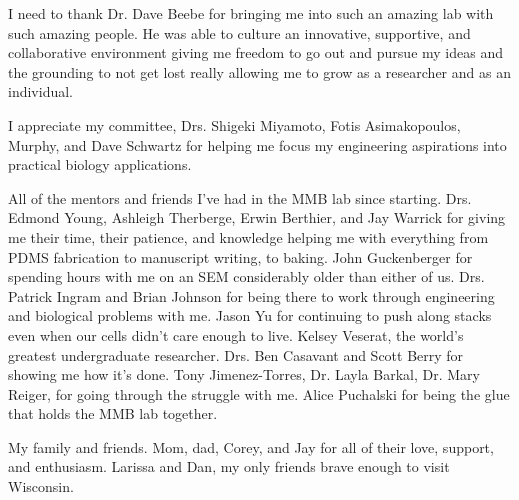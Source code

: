 I need to thank Dr. Dave Beebe for bringing me into such an amazing lab with such amazing people. He was able to culture an innovative, supportive, and collaborative environment giving me freedom to go out and pursue my ideas and the grounding to not get lost really allowing me to grow as a researcher and as an individual.

I appreciate my committee, Drs. Shigeki Miyamoto, Fotis Asimakopoulos, Murphy, and Dave Schwartz for helping me focus my engineering aspirations into practical biology applications.

All of the mentors and friends I've had in the MMB lab since starting. Drs. Edmond Young, Ashleigh Therberge, Erwin Berthier, and Jay Warrick for giving me their time, their patience, and knowledge helping me with everything from PDMS fabrication to manuscript writing, to baking. John Guckenberger for spending hours with me on an SEM considerably older than either of us. Drs. Patrick Ingram and Brian Johnson for being there to work through engineering and biological problems with me. Jason Yu for continuing to push along stacks even when our cells didn't care enough to live. Kelsey Veserat, the world's greatest undergraduate researcher. Drs. Ben Casavant and Scott Berry for showing me how it's done. Tony Jimenez-Torres, Dr. Layla Barkal, Dr. Mary Reiger, for going through the struggle with me. Alice Puchalski for being the glue that holds the MMB lab together.

My family and friends. Mom, dad, Corey, and Jay for all of their love, support, and enthusiasm. Larissa and Dan, my only friends brave enough to visit Wisconsin.

